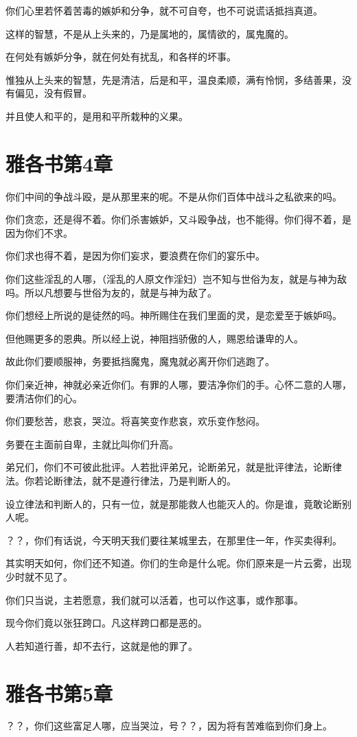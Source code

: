 \documentclass[12pt,oneside]{book}
\begin{document}
你们心里若怀着苦毒的嫉妒和分争，就不可自夸，也不可说谎话抵挡真道。

这样的智慧，不是从上头来的，乃是属地的，属情欲的，属鬼魔的。

在何处有嫉妒分争，就在何处有扰乱，和各样的坏事。

惟独从上头来的智慧，先是清洁，后是和平，温良柔顺，满有怜悯，多结善果，没有偏见，没有假冒。

并且使人和平的，是用和平所栽种的义果。

\chapter{雅各书第4章}
你们中间的争战斗殴，是从那里来的呢。不是从你们百体中战斗之私欲来的吗。

你们贪恋，还是得不着。你们杀害嫉妒，又斗殴争战，也不能得。你们得不着，是因为你们不求。

你们求也得不着，是因为你们妄求，要浪费在你们的宴乐中。

你们这些淫乱的人哪，（淫乱的人原文作淫妇）岂不知与世俗为友，就是与神为敌吗。所以凡想要与世俗为友的，就是与神为敌了。

你们想经上所说的是徒然的吗。神所赐住在我们里面的灵，是恋爱至于嫉妒吗。

但他赐更多的恩典。所以经上说，神阻挡骄傲的人，赐恩给谦卑的人。

故此你们要顺服神，务要抵挡魔鬼，魔鬼就必离开你们逃跑了。

你们亲近神，神就必亲近你们。有罪的人哪，要洁净你们的手。心怀二意的人哪，要清洁你们的心。

你们要愁苦，悲哀，哭泣。将喜笑变作悲哀，欢乐变作愁闷。

务要在主面前自卑，主就比叫你们升高。

弟兄们，你们不可彼此批评。人若批评弟兄，论断弟兄，就是批评律法，论断律法。你若论断律法，就不是遵行律法，乃是判断人的。

设立律法和判断人的，只有一位，就是那能救人也能灭人的。你是谁，竟敢论断别人呢。

？？，你们有话说，今天明天我们要往某城里去，在那里住一年，作买卖得利。

其实明天如何，你们还不知道。你们的生命是什么呢。你们原来是一片云雾，出现少时就不见了。

你们只当说，主若愿意，我们就可以活着，也可以作这事，或作那事。

现今你们竟以张狂跨口。凡这样跨口都是恶的。

人若知道行善，却不去行，这就是他的罪了。

\chapter{雅各书第5章}
？？，你们这些富足人哪，应当哭泣，号？？，因为将有苦难临到你们身上。
\end{document}
